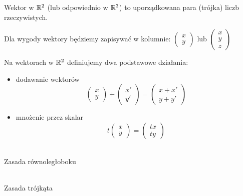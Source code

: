 \begin{df}[algebraiczna]
    Wektor w $\mathbb{R}^2$ (lub odpowiednio w $\mathbb{R}^3$) to uporządkowana para (trójka) liczb rzeczywistych.
\end{df}
    
\begin{ozn}
Dla wygody wektory będziemy zapisywać w kolumnie: $\begin{pmatrix} x \\ y\end{pmatrix}$ lub 
$\begin{pmatrix} x \\ y \\ z \end{pmatrix}$
\end{ozn}
    
\begin{minipage}[c]{0.70\textwidth}
Na wektorach w $\mathbb{R}^2$ definiujemy dwa podstawowe działania:
\begin{itemize}
\item dodawanie wektorów
    \[ \begin{pmatrix} x \\ y\end{pmatrix} + \begin{pmatrix} x' \\ y' \end{pmatrix} =
    \begin{pmatrix} x+x' \\ y + y'\end{pmatrix} \]
\item mnożenie przez skalar
    \[ t \begin{pmatrix} x \\ y\end{pmatrix} = \begin{pmatrix} tx \\ ty \end{pmatrix} \]
\end{itemize}
\end{minipage}%
\begin{minipage}[c]{0.28\textwidth}

 \\
\small{Zasada równoległoboku} \\
 \\ \small{Zasada trójkąta}
\end{minipage}
    
